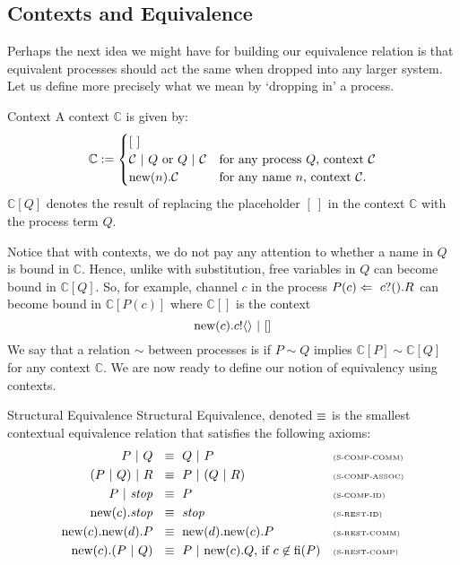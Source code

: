 \subsection{Contexts and Equivalence}
Perhaps the next idea we might have for building our equivalence relation is that equivalent processes should act the same when dropped into any larger system.  
Let us define more precisely what we mean by `dropping in' a process.
\begin{definition}{Context}
	A context $\mathbb{C}$ is given by:
	\[
		\mathbb{C} := \begin{cases}
		[\ ]\\
		\mathcal{C} \ |\  Q \text{ or } Q \ |\  \mathcal{C} & \text{for any process $Q$, context $\mathcal{C}$}\\
		\text{new}({n}).\mathcal{C} & \text{for any name $n$, context $\mathcal{C}$}.
		\end{cases}
	\]
	$\mathbb{C}[Q]$ denotes the result of replacing the placeholder $[\ ]$ in the context $\mathbb{C}$ with the process term $Q$.
	\end{definition}
	Notice that with contexts, we do not pay any attention to whether a name in $Q$ is bound in $\mathbb{C}$.  
Hence, unlike with substitution, free variables in $Q$ can become bound in $\mathbb{C}[Q]$.  
So, for example, channel $c$ in the process $P(c) \Leftarrow\  {c}?({}).R$ can become bound in $\mathbb{C}[P(c)]$ where $\mathbb{C}[]$ is the context
\[
	\text{new}({c}).{c}!\langle{}\rangle \ |\  []
\]
We say that a relation $\sim$ between processes is  if $P\sim Q$ implies $\mathbb{C}[P]\sim \mathbb{C}[Q]$ for any context $\mathbb{C}$.  
We are now ready to define our notion of equivalency using contexts.
	\begin{definition}{Structural Equivalence}
		Structural Equivalence, denoted $\equiv$ is the smallest contextual equivalence relation that satisfies the following axioms:
		\begin{align*}
			P \ |\  Q\ &\  \equiv\  Q \ |\  P && \text{\tiny{(S-COMP-COMM)}}\\
		 	(P \ |\  Q) \ |\  R\ &\ \equiv\ P \ |\  (Q \ |\  R) && \text{\tiny{(S-COMP-ASSOC)}}\\
			P \ |\  \mbox{\emph{stop}}\ &\ \equiv\ P && \text{\tiny{(S-COMP-ID)}}\\
			\text{new}({c}). \mbox{\emph{stop}}\ &\ \equiv\ \mbox{\emph{stop}} && \text{\tiny{(S-REST-ID)}}\\
			\text{new}({c}).\text{new}({d}). P \ &\ \equiv\ \text{new}({d}).\text{new}({c}). P && \text{\tiny{(S-REST-COMM)}}\\
			\text{new}({c}).(P \ |\  Q)\ &\ \equiv\  P \ |\  \text{new}({c}).Q\text{, if } c\not\in \mbox{fi}(P) && \text{\tiny{(S-REST-COMP)}}
		\end{align*}
	\end{definition}
